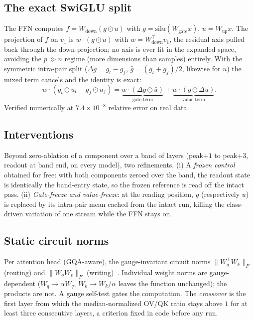 \documentclass[11pt]{article}
\begin{document}
\subsection{The exact SwiGLU split}
\label{sec:swiglu}

The FFN computes $f = W_{\mathrm{down}}(g \odot u)$ with
$g = \mathrm{silu}(W_{\mathrm{gate}} x)$, $u = W_{\mathrm{up}} x$. The
projection of $f$ on $v_1$ is $w \cdot (g \odot u)$ with
$w = W_{\mathrm{down}}^{\top} v_1$, the residual axis pulled back through
the down-projection; no axis is ever fit in the expanded space, avoiding the
$p \gg n$ regime (more dimensions than samples) entirely. With the symmetric
intra-pair split ($\Delta g = g_t - g_f$, $\bar g = (g_t + g_f)/2$, likewise
for $u$) the mixed term cancels and the identity is exact:
\begin{equation}
w \cdot (g_t \odot u_t - g_f \odot u_f)
= \underbrace{w \cdot (\Delta g \odot \bar u)}_{\text{gate term}}
+ \underbrace{w \cdot (\bar g \odot \Delta u)}_{\text{value term}}.
\label{eq:split}
\end{equation}
Verified numerically at $7.4 \times 10^{-8}$ relative error on real data.

\subsection{Interventions}
\label{sec:interventions}

Beyond zero-ablation of a component over a band of layers (peak$+1$ to
peak$+3$, readout at band end, on every model), two refinements. (i) A
\emph{frozen control} obtained for free: with both components zeroed over
the band, the readout state is identically the band-entry state, so the
frozen reference is read off the intact pass. (ii) \emph{Gate-freeze and
value-freeze}: at the reading position, $g$ (respectively $u$) is replaced
by its intra-pair mean cached from the intact run, killing the class-driven
variation of one stream while the FFN stays on.

\subsection{Static circuit norms}
\label{sec:circuits}

Per attention head (GQA-aware), the gauge-invariant circuit norms
$\lVert W_q^{\top} W_k \rVert_F$ (routing) and $\lVert W_o W_v \rVert_F$
(writing)~\cite{elhage2021}. Individual weight norms are gauge-dependent
($W_q \to \alpha W_q$, $W_k \to W_k / \alpha$ leaves the function
unchanged); the products are not. A gauge self-test gates the computation.
The \emph{crossover} is the first layer from which the median-normalized
OV/QK ratio stays above $1$ for at least three consecutive layers, a
criterion fixed in code before any run.
\end{document}
